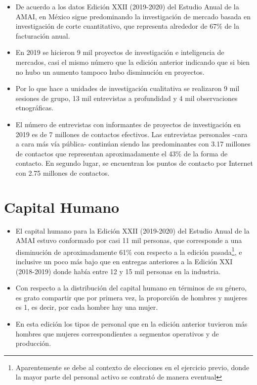 \begin{itemize}
\item De acuerdo a los datos Edición XXII (2019-2020) del Estudio Anual de la AMAI, en México sigue predominando la investigación de mercado basada en investigación de corte cuantitativo, que representa alrededor de 67\% de la facturación anual.
\item En 2019 se hicieron 9 mil proyectos de investigación e inteligencia de mercados, casi el mismo número que la edición anterior indicando que si bien no hubo un aumento tampoco hubo disminución en proyectos. 
\item Por lo que hace a unidades de investigación cualitativa se realizaron 9 mil sesiones de grupo, 13 mil entrevistas a profundidad y 4 mil observaciones etnográficas.
\item El número de entrevistas con informantes de proyectos de investigación en 2019 es de 7 millones de contactos efectivos. Las entrevistas personales -cara a cara más vía pública- continúan siendo las predominantes con 3.17 millones de contactos que representan aproximadamente el 43\% de la forma de contacto. En segundo lugar, se encuentran los puntos de contacto por Internet con 2.75 millones de contactos.
\end{itemize}


\section{Capital Humano}

\begin{itemize}
\item El capital humano para la Edición XXII (2019-2020) del Estudio Anual de la AMAI estuvo conformado por casi 11 mil personas, que corresponde a una disminución de aproximadamente 61\% con respecto a la edición pasada\footnote{Aparentemente se debe al contexto de elecciones en el ejercicio previo, donde la mayor parte del personal activo se contrató de manera eventual}, e inclusive un poco más bajo que en entregas anteriores a la Edición XXI (2018-2019) donde había entre 12 y 15 mil personas en la industria.
\item Con respecto a la distribución del capital humano en términos de su género, es grato compartir que por primera vez, la proporción de hombres y mujeres es 1, es decir, por cada hombre hay una mujer. 

\item En esta edición los tipos de personal que en la edición anterior tuvieron más hombres que mujeres correspondientes a segmentos operativos y de producción.
\end{itemize}

